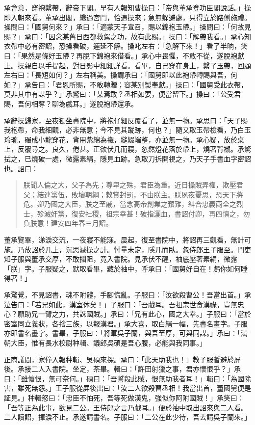 承會意，穿袍繫帶，辭帝下閣。早有人報知曹操曰：「帝與董承登功臣閣說話。」操即入朝來看。董承出閣，纔過宮門，恰遇操來；急無躲避處，只得立於路側施禮。操問曰：「國舅何來？」承曰：「適蒙天子宣召，賜以錦袍玉帶。」操問曰：「何故見賜？」承曰：「因念某舊日西都救駕之功，故有此賜。」操曰：「解帶我看。」承心知衣帶中必有密詔，恐操看破，遲延不解。操叱左右：「急解下來！」看了半晌，笑曰：「果然是條好玉帶？再脫下錦袍來借看。」承心中畏懼，不敢不從，遂脫袍獻上。操親自以手提起，對日影中細細詳看。看畢，自己穿在身上，繫了玉帶，回顧左右曰：「長短如何？」左右稱美。操謂承曰：「國舅即以此袍帶轉賜與吾，何如？」承告曰：「君恩所賜，不敢轉贈；容某別製奉獻。」操曰：「國舅受此衣帶，莫非其中有謀乎？」承驚曰：「某焉敢？丞相如要，便當留下。」操曰：「公受君賜，吾何相奪？聊為戲耳。」遂脫袍帶還承。

承辭操歸家，至夜獨坐書院中，將袍仔細反覆看了，並無一物。承思曰：「天子賜我袍帶，命我細觀，必非無意；今不見其蹤跡，何也？」隨又取玉帶檢看，乃白玉玲瓏，碾成小龍穿花，背用紫綿為襯，縫綴端整，亦並無一物。承心疑，放於桌上，反覆尋之。良久，倦甚。正欲伏几而寢，忽然燈花落於帶上，燒著背襯。承驚拭之，已燒破一處，微露素絹，隱見血跡。急取刀拆開視之，乃天子手書血字密詔也。詔曰：

\begin{quote}
朕聞人倫之大，父子為先；尊卑之殊，君臣為重。近日操賊弄權，欺壓君父；結連黨伍，敗壞朝綱；敕賞封罰，不由朕主。朕夙夜憂思，恐天下將危。卿乃國之大臣，朕之至戚，當念高帝創業之艱難，糾合忠義兩全之烈士，殄滅奸黨，復安社稷，祖宗幸甚！破指灑血，書詔付卿，再四慎之，勿負朕意！建安四年春三月詔。
\end{quote}

董承覽畢，涕淚交流，一夜寢不能寐。晨起，復至書院中，將詔再三觀看，無計可施。乃放詔於几上，沉思滅操之計。忖量未定，隱几而臥。忽侍郎王子服至。門吏知子服與董承交厚，不敢攔阻，竟入書院。見承伏不醒，袖底壓著素絹，微露「朕」字。子服疑之，默取看畢，藏於袖中，呼承曰：「國舅好自在！虧你如何睡得著！」

承驚覺，不見詔書，魂不附體，手腳慌亂。子服曰：「汝欲殺曹公！吾當出首。」承泣告曰：「若兄如此，漢室休矣！」子服曰：「吾戲耳。吾祖宗世食漢祿，豈無忠心？願助兄一臂之力，共誅國賊。」承曰：「兄有此心，國之大幸。」子服曰：「當於密室同立義狀，各捨三族，以報漢君。」承大喜，取白絹一幅，先書名畫字。子服亦即書名畫字。書畢，子服曰：「將軍吳子蘭，與吾至厚，可與同謀。」承曰：「滿朝大臣，惟有長水校尉种輯、議郎吳碩是吾心腹，必能與我同事。」

正商議間，家僮入報种輯、吳碩來探。承曰：「此天助我也！」教子服暫避於屏後。承接二人入書院。坐定，茶畢。輯曰：「許田射獵之事，君亦懷恨乎？」承曰：「雖懷恨，無可奈何。」碩曰：「吾誓殺此賊，恨無助我者耳！」輯曰：「為國除害，雖死無怨。」王子服從屏後出曰：「汝二人欲殺曹丞相！我當出首，董國舅便是証見。」种輯怒曰：「忠臣不怕死，吾等死做漢鬼，強似你阿附國賊！」承笑曰：「吾等正為此事，欲見二公。王侍郎之言乃戲耳。」便於袖中取出詔來與二人看。二人讀詔，揮淚不止。承遂請書名。子服曰：「二公在此少待，吾去請吳子蘭來。」

